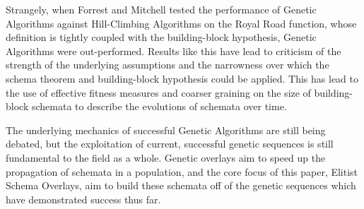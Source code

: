 Strangely, when Forrest and Mitchell tested the performance of Genetic Algorithms against Hill-Climbing Algorithms on the Royal Road function, whose definition is tightly coupled with the building-block hypothesis, Genetic Algorithms were out-performed\cite{Forrest93}. Results like this have lead to criticism of the strength of the underlying assumptions and the narrowness over which the schema theorem and building-block hypothesis could be applied\cite{Burjorjee08, Senaratna05}. This has lead to the use of effective fitness measures and coarser graining on the size of building-block schemata to describe the evolutions of schemata over time\cite{Stephens99}.

The underlying mechanics of successful Genetic Algorithms are still being debated, but the exploitation of current, successful genetic sequences is still fundamental to the field as a whole\cite{Russell10, Senaratna05}. Genetic overlays aim to speed up the propagation of schemata in a population, and the core focus of this paper, Elitist Schema Overlays, aim to build these schemata off of the genetic sequences which have demonstrated success thus far. 